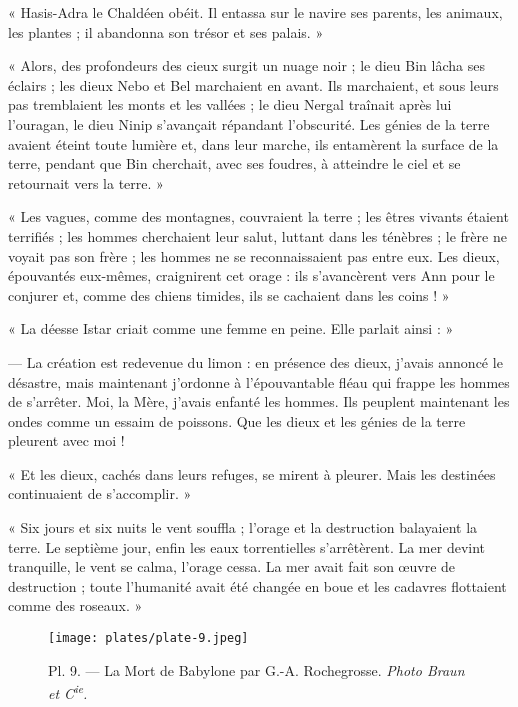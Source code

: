 \documentclass[a4paper, 11pt, oneside, polutonikogreek, french]{article}
\begin{document}
« Hasis-Adra le Chaldéen obéit. Il entassa sur le navire ses parents, les animaux, les plantes ; il abandonna son trésor et ses palais. »

« Alors, des profondeurs des cieux surgit un nuage noir ; le dieu Bin lâcha ses éclairs ; les dieux Nebo et Bel marchaient en avant. Ils marchaient, et sous leurs pas tremblaient les monts et les vallées ; le dieu Nergal traînait après lui l'ouragan, le dieu Ninip s'avançait répandant l'obscurité. Les génies de la terre avaient éteint toute lumière et, dans leur marche, ils entamèrent la surface de la terre, pendant que Bin cherchait, avec ses foudres, à atteindre le ciel et se retournait vers la terre. »

« Les vagues, comme des montagnes, couvraient la terre ; les êtres vivants étaient terrifiés ; les hommes cherchaient leur salut, luttant dans les ténèbres ; le frère ne voyait pas son frère ; les hommes ne se reconnaissaient pas entre eux. Les dieux, épouvantés eux-mêmes, craignirent cet orage : ils s'avancèrent vers Ann pour le conjurer et, comme des chiens timides, ils se cachaient dans les coins ! »

« La déesse Istar criait comme une femme en peine. Elle parlait ainsi : »

--- La création est redevenue du limon : en présence des dieux, j'avais annoncé le désastre, mais maintenant j'ordonne à l'épouvantable fléau qui frappe les hommes de s'arrêter. Moi, la Mère, j'avais enfanté les hommes. Ils peuplent maintenant les ondes comme un essaim de poissons. Que les dieux et les génies de la terre pleurent avec moi !

« Et les dieux, cachés dans leurs refuges, se mirent à pleurer. Mais les destinées continuaient de s'accomplir. »

« Six jours et six nuits le vent souffla ; l'orage et la destruction balayaient la terre. Le septième jour, enfin les eaux torrentielles s'arrêtèrent. La mer devint tranquille, le vent se calma, l'orage cessa. La mer avait fait son œuvre de destruction ; toute l'humanité avait été changée en boue et les cadavres flottaient comme des roseaux. »
\clearpage
\begin{landscape}
\begin{figure}[H]
\centering
\texttt{[image: plates/plate-9.jpeg]}
\caption{Pl. 9. --- La Mort de Babylone par G.-A. Rochegrosse. \emph{Photo Braun et C\textsuperscript{ie}.}}
\end{figure}
\end{landscape}
\clearpage
\end{document}
